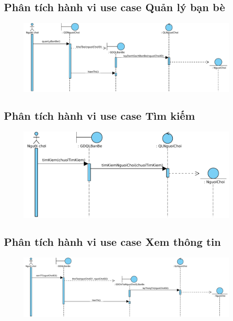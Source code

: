 \documentclass[3p]{elsarticle}
\begin{document}
\subsection{Phân tích hành vi use case Quản lý bạn bè}
\begin{figure}[!htbp]
	\hspace*{-.5in}
	\centering
	\includegraphics[scale=.5]{images/sequence-pdfs/gamer/FriendManagement.pdf}
\end{figure}
\subsection{Phân tích hành vi use case Tìm kiếm}
\begin{figure}[!htbp]
	\hspace*{-.5in}
	\centering
	\includegraphics[scale=.55]{images/sequence-pdfs/gamer/FriendManagement_Search.pdf}
\end{figure}
\subsection{Phân tích hành vi use case Xem thông tin}
\begin{figure}[!htbp]
	\hspace*{-.5in}
	\centering
	\includegraphics[scale=.55]{images/sequence-pdfs/gamer/FriendManagement_ViewInfo.pdf}
\end{figure}
\newpage
\end{document}
